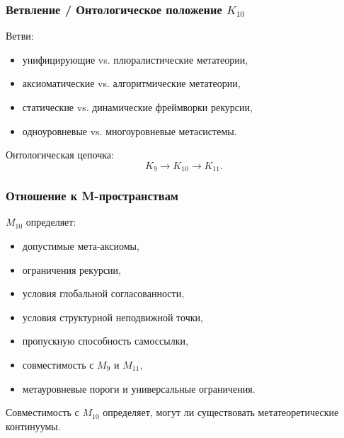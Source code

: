 \subsubsection{Ветвление / Онтологическое положение $K_{10}$}

Ветви:
\begin{itemize}
    \item унифицирующие vs. плюралистические метатеории,
    \item аксиоматические vs. алгоритмические метатеории,
    \item статические vs. динамические фреймворки рекурсии,
    \item одноуровневые vs. многоуровневые метасистемы.
\end{itemize}

Онтологическая цепочка:
\[
K_9 \to K_{10} \to K_{11}.
\]

\subsubsection{Отношение к M-пространствам}

$M_{10}$ определяет:
\begin{itemize}
    \item допустимые мета-аксиомы,
    \item ограничения рекурсии,
    \item условия глобальной согласованности,
    \item условия структурной неподвижной точки,
    \item пропускную способность самоссылки,
    \item совместимость с $M_9$ и $M_{11}$,
    \item метауровневые пороги и универсальные ограничения.
\end{itemize}

Совместимость с $M_{10}$ определяет, могут ли существовать метатеоретические континуумы.
